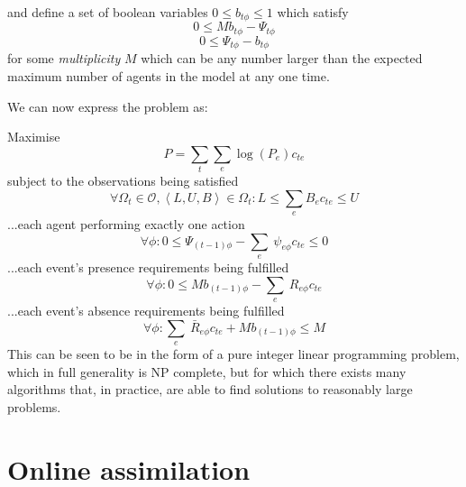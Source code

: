 \documentclass{article}
\begin{document}
and define a set of boolean variables $0 \le b_{t\phi} \le 1$ which satisfy
\begin{equation}
0 \le Mb_{t\phi} - \Psi_{t\phi}
\label{bGEconstraint}
\end{equation}
\begin{equation}
0 \le \Psi_{t\phi} - b_{t\phi} 
\label{bLEconstraint}
\end{equation}
for some \textit{multiplicity} $M$ which can be any number larger than the expected maximum number of agents in the model at any one time.

We can now express the problem as:

Maximise
\begin{equation}
P = \sum_t\sum_e \log(P_e)c_{te}
\end{equation}
subject to the observations being satisfied
\begin{equation}
\forall \Omega_t \in \mathcal{O}, \left<L,U,B\right> \in \Omega_t: L \le \sum_e B_e c_{te} \le U
\label{observation}
\end{equation}
...each agent performing exactly one action
\begin{equation}
\forall\phi: 0 \le \Psi_{(t-1)\phi} -  \sum_e\ \psi_{e\phi} c_{te} \le 0
\label{IPagency}
\end{equation}
...each event's presence requirements being fulfilled
\begin{equation}
\forall\phi: 0 \le Mb_{(t-1)\phi} - \sum_e\ R_{e\phi} c_{te} 
\end{equation}
...each event's absence requirements being fulfilled
\begin{equation}
\forall\phi: \sum_e\ \bar{R}_{e\phi} c_{te} + Mb_{(t-1)\phi} \le M
\label{absenceConstraint}
\end{equation}
This can be seen to be in the form of a pure integer linear programming problem, which in full generality is NP complete, but for which there exists many algorithms that, in practice, are able to find solutions to reasonably large problems.


\section{Online assimilation}
\end{document}
